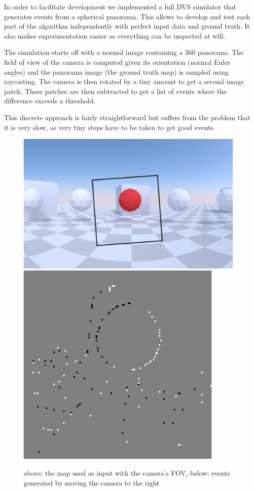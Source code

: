 In order to facilitate development we implemented a full DVS simulator that
generates events from a spherical panorama.  This allows to develop and test
each part of the algorithm independently with perfect input data and ground
truth. It also makes experimentation easier as everything can be inspected at
will.

The simulation starts off with a normal image containing a 360\textdegree
panorama. The field of view of the camera is computed given its orientation
(normal Euler angles) and the panorama image (the ground truth map) is sampled
using raycasting. The camera is then rotated by a tiny amount to get a second
image patch. These patches are then subtracted to get a list of events where
the difference exceeds a threshold.

This discrete approach is fairly straightforward but suffers from the problem
that it is very slow, as very tiny steps have to be taken to get good events.

\begin{figure}
\includegraphics[width=\linewidth]{images/simulation_raw.jpg}
\includegraphics[width=\linewidth]{images/simulation_events.jpg}
\caption{above: the map used as input with the camera's FOV, below: events generated by moving the camera to the right}
\label{fig:simulation}
\end{figure}
